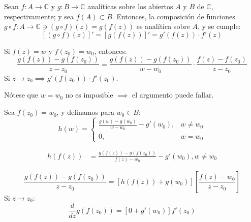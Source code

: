 \begin{teorema}
    Sean $f:A\to \mathbb{C}$ y $g:B\to \mathbb{C}$ analíticas sobre los abiertos $A$ y $B$ de $\mathbb{C}$, respectivamente; y sea $f(A)\subset B$. Entonces, la composición de funciones $g\circ f: A\to \mathbb{C}\ni (g\circ f)(z)= g(f(z))$ es analítica sobre $A$, y se cumple: 
    $$\left[(g\circ f)(z)\right]' = \left[g(f(z))\right]' = g'(f(z))\cdot f'(z)$$
    \begin{cajita}
        \begin{dem}[Esquema]
            Si $f(z)=w$ y $f(z_0)=w_0$, entonces: 
            $$\frac{g(f(z))-g(f(z_0))}{z-z_0}=\frac{g(f(z))-g(f(z_0))}{w-w_0}\cdot \frac{f(z)-f(z_0)}{z-z_0}$$
            Si $z\to z_0\implies g'(f(z_0))\cdot f'(z_0)$.

            Nótese que $w=w_0$ no es imposible $\implies$ el argumento puede fallar.
        \end{dem}
    \end{cajita}
    \begin{dem}
        Sea $f(z_0)=w_0$, y definamos para $w_0\in B:$
        $$h(w)= \begin{cases}
            \frac{g(w)-g(w_0)}{w-w_0}-g'(w_0),& w\neq w_0\\
            0,& w=w_0
        \end{cases}
        $$

        \begin{align*}
            h(f(z)) &= \frac{g(f(z))-g(f(z_0))}{f(z)-w_0}-g'(w_0), w\neq w_0
        \end{align*}

        $$\frac{g(f(z))-g(f(z_0))}{z-z_0} = \left[h(f(z))+g(w_0)\right]\left[\frac{f(z)-w_0}{z-z_0}\right]$$
        Si $z\to z_0$:
        $$\frac{d}{dz}g(f(z_0))=\left[0+g'(w_0)\right]f'(z_0)$$
    \end{dem}
\end{teorema}

